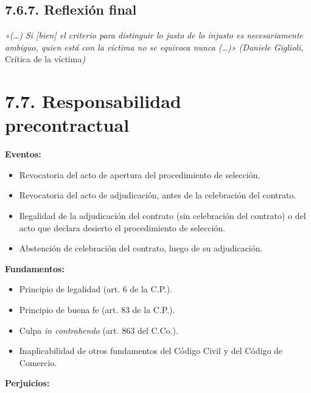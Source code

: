 \subsection{7.6.7. Reflexión final}
\begin{cita}
\textit{«(…) Si [bien] el criterio para distinguir lo justo de lo injusto es necesariamente ambiguo, quien está con la víctima no se equivoca nunca (…)» (Daniele Giglioli, }Crítica de la víctima\textit{)}
\end{cita}
\section{7.7. Responsabilidad precontractual}
\textbf{Eventos:}

\begin{itemize}
\item Revocatoria del acto de apertura del procedimiento de selección.
\item Revocatoria del acto de adjudicación, antes de la celebración del contrato.
\item Ilegalidad de la adjudicación del contrato (sin celebración del contrato) o del acto que declara desierto el procedimiento de selección.
\item Abstención de celebración del contrato, luego de su adjudicación.
\end{itemize}
\textbf{Fundamentos:}

\begin{itemize}
\item Principio de legalidad (art. 6 de la C.P.).
\item Principio de buena fe (art. 83 de la C.P.).
\item Culpa \textit{in contrahendo} (art. 863 del C.Co.).
\item Inaplicabilidad de otros fundamentos del Código Civil y del Código de Comercio.
\end{itemize}
\textbf{Perjuicios:}

